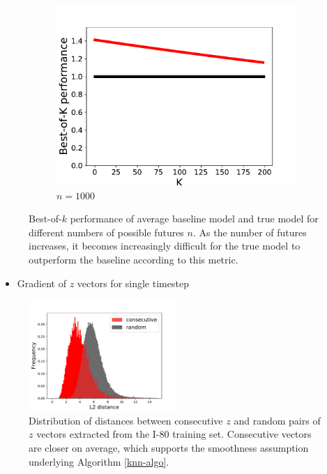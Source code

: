 \documentclass{article}
\begin{document}
\begin{figure}
  \begin{subfigure}[b]{0.3\textwidth}
    \includegraphics[width=\textwidth]{images/best_of_k_toy_n1000.pdf}
    \caption{$n=1000$}
    \label{fig:mouse}
  \end{subfigure}
  \caption{Best-of-$k$ performance of average baseline model and true model for different numbers of possible futures $n$. As the number of futures increases, it becomes increasingly difficult for the true model to outperform the baseline according to this metric.}\label{expected-loss}
  \end{figure}



\begin{itemize}
\item Gradient of $z$ vectors for single timestep
\end{itemize}


\begin{figure}
  \centering
  \includegraphics[width=0.5\textwidth]{images/distance_histograms.pdf}
  \caption{Distribution of distances between consecutive $z$ and random pairs of $z$ vectors extracted from the I-80 training set. Consecutive vectors are closer on average, which supports the smoothness assumption underlying Algorithm \ref{knn-algo}.}
\end{figure}
\end{document}
